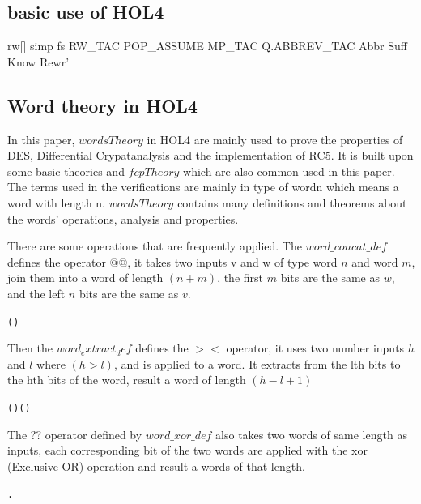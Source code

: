 \documentclass{article}
\begin{document}
\subsection{basic use of HOL4}
rw[] simp fs
RW_TAC
POP_ASSUME MP_TAC
Q.ABBREV_TAC Abbr
Suff Know Rewr'

\subsection{Word theory in HOL4}
In this paper, $wordsTheory$ in HOL4 are mainly used to prove the properties of DES, Differential Crypatanalysis
and the implementation of RC5. It is built upon some basic theories and $fcpTheory$ which are also common used in
this paper. The terms used in the verifications are mainly in type of wordn which means a word with length n.
$wordsTheory$ contains many definitions and theorems about the words' operations, analysis and properties.

There are some operations that are frequently applied. The $word\_concat\_def$ defines the operator $@@$, it takes two
inputs v and w of type word $n$ and word $m$, join them into a word of length $(n+m)$, the first $m$ bits are the same as $w$,
and the left $n$ bits are the same as $v$.
\begin{alltt}
   \HOLTokenTurnstile{}    \HOLSymConst{=}  (  )
\end{alltt}

Then the $word_extract_def$ defines the $><$ operator, it uses two number inputs $h$ and $l$ where $(h>l)$, and is applied
to a word. It extracts from the lth bits to the hth bits of the word, result a word of length $(h-l+1)$
\begin{alltt}
   \HOLTokenTurnstile{} ( \HOLSymConst{\HOLTokenExtract{}} ) \HOLSymConst{=}  \HOLSymConst{\HOLTokenCompose} ( \HOLSymConst{--} )
\end{alltt}

The $??$ operator defined by $word\_xor\_def$ also takes two words of same length as inputs,
each corresponding bit of the two words are applied with the xor (Exclusive-OR) operation
and result a words of that length.
\begin{alltt}
   \HOLTokenTurnstile{}  \HOLSymConst{\HOLTokenEor{}}  \HOLSymConst{=}  .    \HOLSymConst{\HOLTokenNotEquiv{}}   
\end{alltt}
\end{document}
